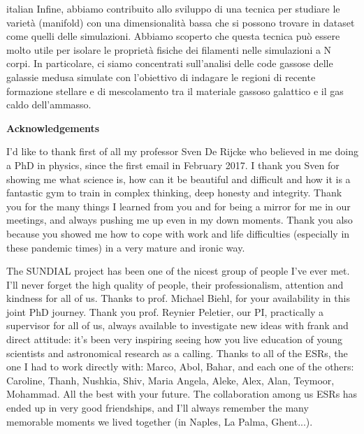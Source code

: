 \begin{otherlanguage*}{italian}
Infine, abbiamo contribuito allo sviluppo di una tecnica per studiare le varietà (manifold) con una dimensionalità bassa che si possono trovare in dataset come quelli delle simulazioni.
Abbiamo scoperto che questa tecnica può essere molto utile per isolare le proprietà fisiche dei filamenti nelle simulazioni a N corpi.
In particolare, ci siamo concentrati sull'analisi delle code gassose delle galassie medusa simulate con l'obiettivo di indagare le regioni di recente formazione stellare e di mescolamento tra il materiale gassoso galattico e il gas caldo dell'ammasso.
\end{otherlanguage*}


\clearpage
\thispagestyle{empty}
\null%
\label{thesis:acknowledgements}
\begin{center}
  {\Large \textbf{Acknowledgements}}\\
\end{center}
I'd like to thank first of all my professor Sven De Rijcke who believed in me doing a PhD in physics, since the first email in February 2017.
I thank you Sven for showing me what science is, how can it be beautiful and difficult and how it is a fantastic gym to train in complex thinking, deep honesty and integrity.
Thank you for the many things I learned from you and for being a mirror for me in our meetings, and always pushing me up even in my down moments.
Thank you also because you showed me how to cope with work and life difficulties (especially in these pandemic times) in a very mature and ironic way.

The SUNDIAL project has been one of the nicest group of people I've ever met.
I'll never forget the high quality of people, their professionalism, attention and kindness for all of us. Thanks to prof. Michael Biehl, for your availability in this joint PhD journey.
Thank you prof. Reynier Peletier, our PI, practically a supervisor for all of us, always available to investigate new ideas with frank and direct attitude: %
it's been very inspiring seeing how you live education of young scientists and astronomical research as a calling.
Thanks to all of the ESRs, the one I had to work directly with: Marco, Abol, Bahar, and each one of the others: Caroline, Thanh, Nushkia, Shiv, Maria Angela, Aleke, Alex, Alan, Teymoor, Mohammad. All the best with your future.
The collaboration among us ESRs has ended up in very good friendships, and I'll always remember the many memorable moments we lived together (in Naples, La Palma, Ghent...).

